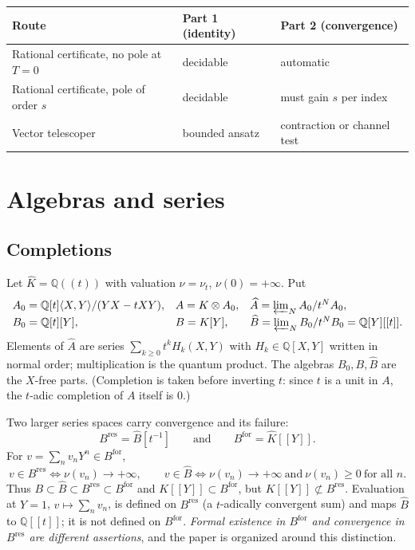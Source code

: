 \documentclass[11pt,a4paper]{article}
\newcommand{\Q}{\mathbb Q}
\newcommand{\Bhat}{\widehat B}
\newcommand{\Ahat}{\widehat A}
\newcommand{\Bres}{B^{\mathrm{res}}}
\newcommand{\Bfor}{B^{\mathrm{for}}}
\newcommand{\Khat}{\widehat K}
\newcommand{\val}{\nu}
\theoremstyle{plain}
\theoremstyle{definition}
\theoremstyle{remark}
\begin{document}
\begin{center}
\begin{tabular}{@{}lll@{}}
\toprule
Route & Part 1 (identity) & Part 2 (convergence)\\\midrule
Rational certificate, no pole at $T=0$ & decidable & automatic\\
Rational certificate, pole of order $s$ & decidable & must gain $s$ per index\\
Vector telescoper & bounded ansatz & contraction or channel test\\
\bottomrule
\end{tabular}
\end{center}

\section{Algebras and series}\label{sec:spaces}

\subsection{Completions}
Let $\Khat=\Q((t))$ with valuation $\val=\val_t$, $\val(0)=+\infty$. Put
\[
\begin{array}{lll}
 A_0=\Q[t]\langle X,Y\rangle/(YX-tXY), & A=K\otimes A_0, & \Ahat=\varprojlim_N A_0/t^NA_0,\\[2pt]
 B_0=\Q[t][Y], & B=K[Y], & \Bhat=\varprojlim_N B_0/t^NB_0=\Q[Y][[t]].
\end{array}
\]
Elements of $\Ahat$ are series $\sum_{k\ge0}t^kH_k(X,Y)$ with $H_k\in\Q[X,Y]$
written in normal order; multiplication is the quantum product. The algebras
$B_0,B,\Bhat$ are the $X$-free parts. (Completion is taken before inverting
$t$: since $t$ is a unit in $A$, the $t$-adic completion of $A$ itself is $0$.)

Two larger series spaces carry convergence and its failure:
\[
  \Bres=\Bhat[t^{-1}]\qquad\text{and}\qquad \Bfor=\Khat[[Y]].
\]
For $v=\sum_n v_nY^n\in\Bfor$,
\begin{equation}\label{eq:membership}
  v\in\Bres\iff \val(v_n)\to+\infty,\qquad
  v\in\Bhat\iff \val(v_n)\to+\infty\ \text{and}\ \val(v_n)\ge0\ \text{for all }n.
\end{equation}
Thus $B\subset\Bhat\subset\Bres\subset\Bfor$ and $K[[Y]]\subset\Bfor$, but
$K[[Y]]\not\subset\Bres$. Evaluation at $Y=1$, $v\mapsto\sum_nv_n$, is defined
on $\Bres$ (a $t$-adically convergent sum) and maps $\Bhat$ to $\Q[[t]]$; it is
not defined on $\Bfor$. \emph{Formal existence in $\Bfor$ and convergence in
$\Bres$ are different assertions}, and the paper is organized around this distinction.
\end{document}
